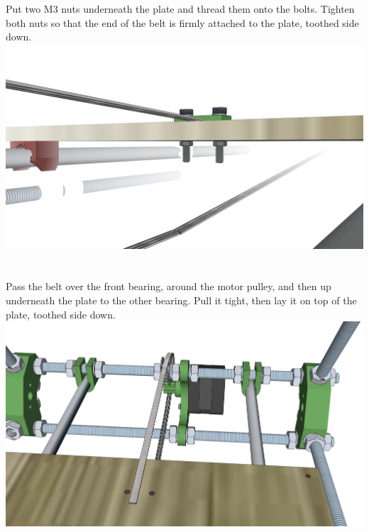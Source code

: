 \documentclass[twoside,openany,a4paper,titlepage]{memoir}
\begin{document}
	\section{}
	Put two M3 nuts underneath the plate and thread them onto the bolts. Tighten both nuts so that the end
	of the belt is firmly attached to the plate, toothed side down.\\
	\includegraphics[width=1\linewidth]{graphics/ch6_25.png}
	
	\section{}
	Pass the belt over the front bearing, around the motor pulley, and then up underneath the plate to the
	other bearing. Pull it tight, then lay it on top of the plate, toothed side down.\\
	\includegraphics[width=1\linewidth]{graphics/ch6_26.png}
	
\end{document}
